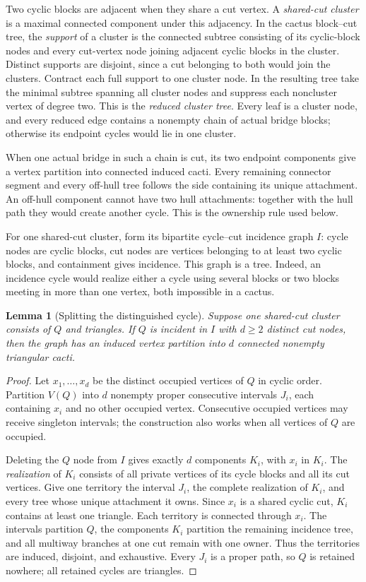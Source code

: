 \documentclass[11pt]{article}
\newtheorem{lemma}[theorem]{Lemma}
\theoremstyle{remark}
\begin{document}
Two cyclic blocks are adjacent when they share a cut vertex.  A
\emph{shared-cut cluster} is a maximal connected component under this
adjacency.  In the cactus block--cut tree, the \emph{support} of a cluster is
the connected subtree consisting of its cyclic-block nodes and every
cut-vertex node joining adjacent cyclic blocks in the cluster.  Distinct
supports are disjoint, since a cut belonging to both would join the clusters.
Contract each full support to one cluster node.  In the resulting tree take
the minimal subtree spanning all cluster nodes and suppress each noncluster
vertex of degree two.  This is the \emph{reduced cluster tree}.  Every leaf is
a cluster node, and every reduced edge contains a nonempty chain of actual
bridge blocks; otherwise its endpoint cycles would lie in one cluster.

When one actual bridge in such a chain is cut, its two endpoint components give
a vertex partition into connected induced cacti.  Every remaining connector
segment and every off-hull tree follows the side containing its unique
attachment.  An off-hull component cannot have two hull attachments: together
with the hull path they would create another cycle.  This is the ownership rule
used below.

For one shared-cut cluster, form its bipartite cycle--cut incidence graph $I$:
cycle nodes are cyclic blocks, cut nodes are vertices belonging to at least two
cyclic blocks, and containment gives incidence.  This graph is a tree.  Indeed,
an incidence cycle would realize either a cycle using several blocks or two
blocks meeting in more than one vertex, both impossible in a cactus.

\begin{lemma}[Splitting the distinguished cycle]\label{lem:qsplit}
Suppose one shared-cut cluster consists of $Q$ and triangles.  If $Q$ is
incident in $I$ with $d\geq2$ distinct cut nodes, then the graph has an induced
vertex partition into $d$ connected nonempty triangular cacti.
\end{lemma}

\begin{proof}
Let $x_1,\ldots,x_d$ be the distinct occupied vertices of $Q$ in cyclic order.
Partition $V(Q)$ into $d$ nonempty proper consecutive intervals $J_i$, each
containing $x_i$ and no other occupied vertex.  Consecutive occupied vertices
may receive singleton intervals; the construction also works when all vertices
of $Q$ are occupied.

Deleting the $Q$ node from $I$ gives exactly $d$ components $K_i$, with $x_i$
in $K_i$.  The \emph{realization} of $K_i$ consists of all private vertices of
its cycle blocks and all its cut vertices.  Give one territory the interval
$J_i$, the complete realization of $K_i$, and every tree whose unique
attachment it owns.  Since $x_i$ is a
shared cyclic cut, $K_i$ contains at least one triangle.  Each territory is
connected through $x_i$.  The intervals partition $Q$, the components $K_i$
partition the remaining incidence tree, and all multiway branches at one cut
remain with one owner.  Thus the territories are induced, disjoint, and
exhaustive.  Every $J_i$ is a proper path, so $Q$ is retained nowhere; all
retained cycles are triangles.
\end{proof}
\end{document}
